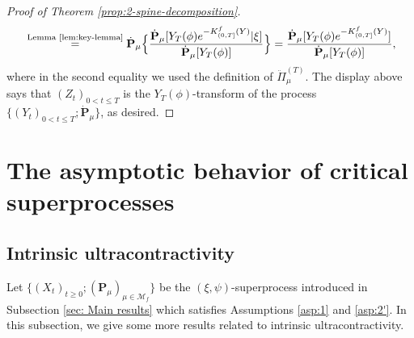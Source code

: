 \documentclass[UTF8]{pkuthss}
\theoremstyle{plain}
\theoremstyle{definition}
\numberwithin{equation}{section}
\begin{document}
\begin{proof}[Proof of Theorem \ref{prop:2-spine-decomposition}]
\begin{align}
	&\quad \overset{\text{Lemma \ref{lem:key-lemma}}}{=} \dot{\mathbf P}_{\mu}\Big\{ \frac{\dot {\mathbf P}_\mu[Y_T(\phi)e^{-K^f_{(0, T]}(Y)}|\xi]}{\dot{\mathbf P}_{\mu}[Y_T(\phi)]}\Big\}=\frac{\dot {\mathbf P}_\mu[Y_T(\phi)e^{-K^f_{(0, T]}(Y)}]}{\dot{\mathbf P}_{\mu}[Y_T(\phi)]},
\end{align}
	where in the second equality we used the definition of $\ddot {\Pi}_{\mu}^{(T)}$.
	The display above says that $(Z_t)_{0< t\leq T}$ is the $Y_T(\phi)$-transform of the process $\{(Y_t)_{0< t\leq T}; \dot {\mathbf P}_\mu\}$, as desired.
\end{proof}


\section{The asymptotic behavior of critical superprocesses}\label{sec:asymptotic}

\subsection{Intrinsic ultracontractivity}
\label{sec:further_assumptions}
  Let $\{(X_t)_{t\geq 0}; (\mathbf P_\mu)_{\mu \in \mathcal M_f}\}$ be the $(\xi,\psi)$-superprocess introduced in Subsection \ref{sec: Main results} which satisfies Assumptions \ref{asp:1} and \ref{asp:2'}. 
  In this subsection, we give some more results related to intrinsic ultracontractivity.
\end{document}
